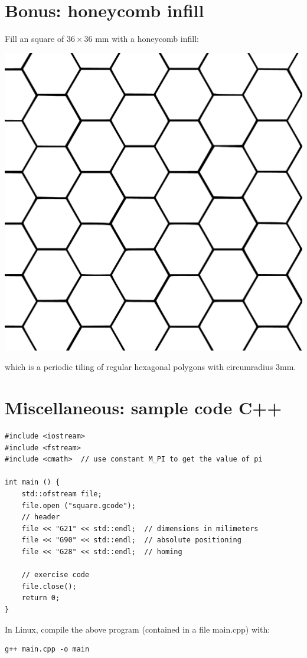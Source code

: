 \documentclass{article}
\begin{document}
\section{Bonus: honeycomb infill}

Fill an square of $36 \times 36$ mm with a honeycomb infill:

\begin{center}
\includegraphics[width=0.25\linewidth]{honeycomb.pdf}
\end{center}

which is a periodic tiling of regular hexagonal polygons with circumradius $3$mm.

\section{Miscellaneous: sample code C++}

\begin{verbatim}
#include <iostream>
#include <fstream>
#include <cmath>  // use constant M_PI to get the value of pi

int main () {
    std::ofstream file;
    file.open ("square.gcode");
    // header
    file << "G21" << std::endl;  // dimensions in milimeters
    file << "G90" << std::endl;  // absolute positioning
    file << "G28" << std::endl;  // homing

    // exercise code
    file.close();
    return 0;
}

\end{verbatim}

In Linux, compile the above program (contained in a file main.cpp) with:

\begin{verbatim}
g++ main.cpp -o main
\end{verbatim}
\end{document}
